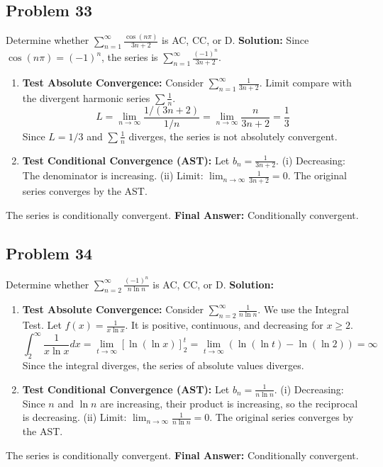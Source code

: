 \documentclass{article}
\begin{document}
\subsection*{Problem 33}
Determine whether $\sum_{n=1}^{\infty} \frac{\cos(n\pi)}{3n+2}$ is AC, CC, or D.
\textbf{Solution:} Since $\cos(n\pi) = (-1)^n$, the series is $\sum_{n=1}^{\infty} \frac{(-1)^n}{3n+2}$.
\begin{enumerate}
    \item \textbf{Test Absolute Convergence:} Consider $\sum_{n=1}^{\infty} \frac{1}{3n+2}$. Limit compare with the divergent harmonic series $\sum \frac{1}{n}$.
    \[ L = \lim_{n \to \infty} \frac{1/(3n+2)}{1/n} = \lim_{n \to \infty} \frac{n}{3n+2} = \frac{1}{3} \]
    Since $L=1/3$ and $\sum \frac{1}{n}$ diverges, the series is not absolutely convergent.
    \item \textbf{Test Conditional Convergence (AST):} Let $b_n = \frac{1}{3n+2}$.
    (i) Decreasing: The denominator is increasing.
    (ii) Limit: $\lim_{n \to \infty} \frac{1}{3n+2} = 0$.
    The original series converges by the AST.
\end{enumerate}
The series is conditionally convergent.
\textbf{Final Answer:} Conditionally convergent.

\subsection*{Problem 34}
Determine whether $\sum_{n=2}^{\infty} \frac{(-1)^n}{n \ln n}$ is AC, CC, or D.
\textbf{Solution:}
\begin{enumerate}
    \item \textbf{Test Absolute Convergence:} Consider $\sum_{n=2}^{\infty} \frac{1}{n \ln n}$. We use the Integral Test. Let $f(x) = \frac{1}{x \ln x}$. It is positive, continuous, and decreasing for $x \ge 2$.
    \[ \int_2^\infty \frac{1}{x \ln x} dx = \lim_{t \to \infty} [\ln(\ln x)]_2^t = \lim_{t \to \infty} (\ln(\ln t) - \ln(\ln 2)) = \infty \]
    Since the integral diverges, the series of absolute values diverges.
    \item \textbf{Test Conditional Convergence (AST):} Let $b_n = \frac{1}{n \ln n}$.
    (i) Decreasing: Since $n$ and $\ln n$ are increasing, their product is increasing, so the reciprocal is decreasing.
    (ii) Limit: $\lim_{n \to \infty} \frac{1}{n \ln n} = 0$.
    The original series converges by the AST.
\end{enumerate}
The series is conditionally convergent.
\textbf{Final Answer:} Conditionally convergent.
\end{document}
